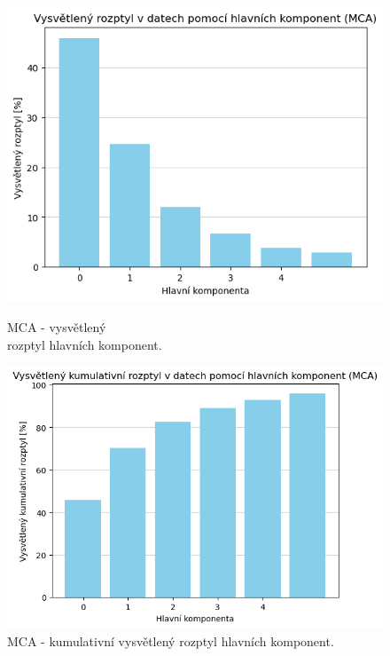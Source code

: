 \begin{figure}[hbtp!]
    \centering
    \begin{minipage}[t]{.5\textwidth}
      \centering
      \captionsetup{justification=centering}

      \includegraphics[width=\textwidth]{obrazky/pripravadat/mca-roztyl_komponetn.png}
      \caption{MCA - vysvětlený \\ rozptyl hlavních komponent.}
      \label{obr:nb:mca_roztyl_komponetn}
    \end{minipage}%
    \begin{minipage}[t]{.5\textwidth}
      \centering
      \captionsetup{justification=centering}

      \includegraphics[width=\textwidth]{obrazky/pripravadat/mca-kum_roztyl_komponetn.png}
      \caption{MCA - kumulativní vysvětlený rozptyl hlavních komponent.}
      \label{obr:nb:mca_kum_roztyl_komponetn}
    \end{minipage}
    \end{figure}

